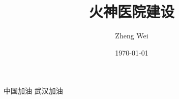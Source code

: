 \documentclass{article}
\title{火神医院建设}   %
\author{Zheng Wei} %
\date{\today}
\begin{document}
	\maketitle
	
	中国加油 武汉加油
	
\end{document}
